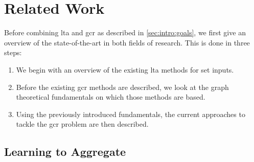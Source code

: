 \chapter{Related Work}%
\label{sec:related}

Before combining \ac{lta} and \ac{gcr} as described in \cref{sec:intro:goals}, we first give an overview of the state-of-the-art in both fields of research.
This is done in three steps:
\begin{enumerate}
	\item We begin with an overview of the existing \ac{lta} methods for set inputs.
	\item Before the existing \ac{gcr} methods are described, we look at the graph theoretical fundamentals on which those methods are based.
	\item Using the previously introduced fundamentals, the current approaches to tackle the \ac{gcr} problem are then described.
\end{enumerate}

\section{Learning to Aggregate}%
\label{sec:related:lta}


